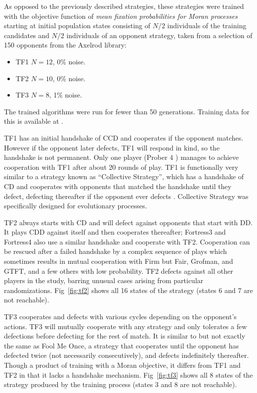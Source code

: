 \documentclass[10pt,letterpaper]{article}
\begin{document}
As opposed to the previously described strategies, these strategies were trained
with the objective function of \textit{mean fixation probabilities for Moran
processes} starting at initial population states consisting of \(N/2\)
individuals of the training candidates and \(N/2\) individuals of an opponent
strategy, taken from a selection of 150 opponents from the Axelrod library:

\begin{itemize}
	\item TF1 \(N=12\), 0\% noise.
	\item TF2 \(N=10\), 0\% noise.
	\item TF3 \(N=8\), 1\% noise.
\end{itemize}

The trained algorithms
were run for fewer than 50 generations. Training data for this is available at
\cite{data}.

TF1 has an initial handshake of CCD and cooperates if the opponent matches.
However if the opponent later defects, TF1 will respond in kind, so the
handshake is not permanent. Only one player (Prober 4 \cite{Prison1998}) manages to
achieve cooperation with TF1 after about 20 rounds of play. TF1 is functionally
very similar to a strategy known as ``Collective Strategy'', which has a
handshake of CD and cooperates with opponents that matched the handshake
until they defect, defecting thereafter if the opponent ever defects \cite{Li2009}.
Collective Strategy was specifically designed for evolutionary processes.

TF2 always starts with CD and will defect against opponents that start with
DD\@. It plays CDD against itself and then cooperates thereafter; Fortress3 and
Fortress4 also use a similar handshake and cooperate with TF2. Cooperation
can be rescued after a failed handshake by a complex sequence of plays
which sometimes results in mutual cooperation with Firm but Fair, Grofman, and
GTFT, and a few others with low probability. TF2 defects against all other
players in the study, barring
unusual cases arising from particular randomizations. Fig~\ref{fig:tf2} shows
all 16 states of the strategy (states 6 and 7 are not reachable).

TF3 cooperates and defects with
various cycles depending on the opponent's actions. TF3 will mutually
cooperate with any strategy and only tolerates a few defections before
defecting for the rest of match. It is similar to but not exactly the same as
Fool Me Once, a strategy that cooperates until the opponent has defected twice
(not necessarily consecutively), and defects indefinitely thereafter. Though a
product of training with a Moran objective, it differs from TF1 and TF2
in that it lacks a handshake mechanism. Fig~\ref{fig:tf3} shows
all 8 states of the strategy produced by the training process (states 3 and 8
are not reachable).
\end{document}

